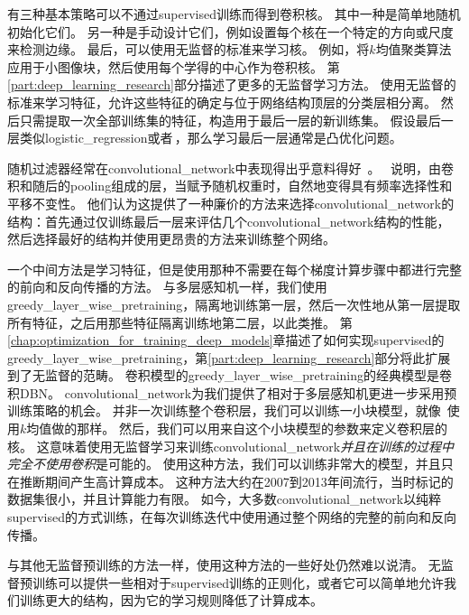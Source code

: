 有三种基本策略可以不通过\gls{supervised}训练而得到卷积核。
其中一种是简单地随机初始化它们。
另一种是手动设计它们，例如设置每个核在一个特定的方向或尺度来检测边缘。
最后，可以使用无监督的标准来学习核。
例如，\cite{Coates2011}将$k$均值聚类算法应用于小图像块，然后使用每个学得的中心作为卷积核。
第\ref{part:deep_learning_research}部分描述了更多的无监督学习方法。
使用无监督的标准来学习特征，允许这些特征的确定与位于网络结构顶层的分类层相分离。
然后只需提取一次全部训练集的特征，构造用于最后一层的新训练集。
假设最后一层类似\gls{logistic_regression}或者\,，那么学习最后一层通常是凸优化问题。

 
 
随机过滤器经常在\gls{convolutional_network}中表现得出乎意料得好~\cite{Jarrett-ICCV2009-small,Saxe-ICML2011,pinto2011scaling,cox2011beyond}。
\cite{Saxe-ICML2011}~说明，由卷积和随后的\gls{pooling}组成的层，当赋予随机权重时，自然地变得具有频率选择性和平移不变性。
他们认为这提供了一种廉价的方法来选择\gls{convolutional_network}的结构：首先通过仅训练最后一层来评估几个\gls{convolutional_network}结构的性能，然后选择最好的结构并使用更昂贵的方法来训练整个网络。

一个中间方法是学习特征，但是使用那种不需要在每个梯度计算步骤中都进行完整的前向和反向传播的方法。
与多层感知机一样，我们使用\gls{greedy_layer_wise_pretraining}，隔离地训练第一层，然后一次性地从第一层提取所有特征，之后用那些特征隔离训练地第二层，以此类推。
第\ref{chap:optimization_for_training_deep_models}章描述了如何实现\gls{supervised}的\gls{greedy_layer_wise_pretraining}，第\ref{part:deep_learning_research}部分将此扩展到了无监督的范畴。
卷积模型的\gls{greedy_layer_wise_pretraining}的经典模型是卷积\gls{DBN}\citep{HonglakL2009}。
\gls{convolutional_network}为我们提供了相对于多层感知机更进一步采用预训练策略的机会。
并非一次训练整个卷积层，我们可以训练一小块模型，就像~\cite{Coates2011}使用$k$均值做的那样。
然后，我们可以用来自这个小块模型的参数来定义卷积层的核。
这意味着使用无监督学习来训练\gls{convolutional_network}\emph{并且在训练的过程中完全不使用卷积}是可能的。
使用这种方法，我们可以训练非常大的模型，并且只在推断期间产生高计算成本\citep{ranzato-cvpr-07-small,Jarrett-ICCV2009-small,koray-nips-10-small,icml2013_coates13}。
这种方法大约在2007到2013年间流行，当时标记的数据集很小，并且计算能力有限。
如今，大多数\gls{convolutional_network}以纯粹\gls{supervised}的方式训练，在每次训练迭代中使用通过整个网络的完整的前向和反向传播。
 
 
与其他无监督预训练的方法一样，使用这种方法的一些好处仍然难以说清。
无监督预训练可以提供一些相对于\gls{supervised}训练的正则化，或者它可以简单地允许我们训练更大的结构，因为它的学习规则降低了计算成本。

